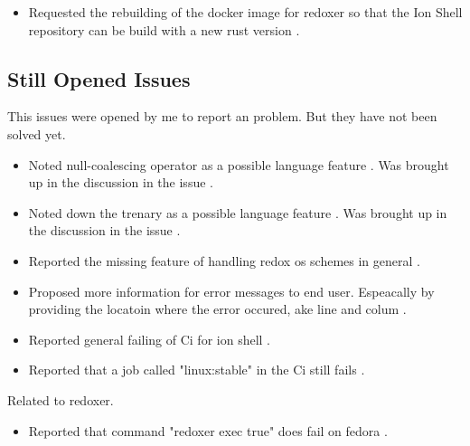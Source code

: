 \begin{itemize}
	\item Requested the rebuilding of the docker image for \gls{redoxer} so that the Ion Shell repository can be build with a new rust version \cite{issue_request_new_docker_version}.
\end{itemize}

\subsection{Still Opened Issues}

This issues were opened by me to report an problem. But they have not been solved yet.

\begin{itemize}
	\item Noted null-coalescing operator as a possible language feature \cite{issue_null_coalescing_operator}. Was brought up in the discussion in the issue \cite{pr_subst_method}.
	\item Noted down the trenary as a possible language feature \cite{issue_ternary_operator_arrays_strings}. Was brought up in the discussion in the issue \cite{pr_subst_method}.
	\item Reported the missing feature of handling redox os schemes in general \cite{issue_disk_scheme}.
	\item Proposed more information for error messages to end user. Espeacally by providing the locatoin where the error occured, ake line and colum \cite{issue_enrich_error_message_information}.
	\item Reported general failing of Ci for ion shell \cite{issue_failing_ci}.
	\item Reported that a job called "linux:stable" in the Ci still fails \cite{issue_ci_linux_stable_fail}.
\end{itemize}

Related to \gls{redoxer}.

\begin{itemize}
	\item Reported that command "redoxer exec true" does fail on fedora \cite{issue_redoxer_exec_true}.
\end{itemize}


